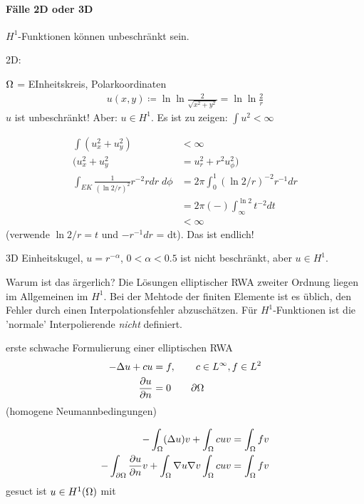 \paragraph{Fälle 2D oder 3D} $H^1$-Funktionen können unbeschränkt sein.
\begin{beispiel} 2D:

$\Omega$ = EInheitskreis, Polarkoordinaten
\begin{align*}
  u(x, y) \coloneqq \ln \ln \frac{2}{\sqrt{x^2 + y^2}} = \ln \ln \frac{2}{r}
\end{align*}
$u$ ist unbeschränkt! Aber: $u \in H^1$. Es ist zu zeigen: $\int u^2< \infty$

\begin{align*}
  \int (u_x^2 + u_y^2)&<\infty \\
( u_x^2 + u_y^2 &= u_r^2 + r^2u_\phi^2 ) \\
\int_{EK} \frac{1}{(\ln 2/r)^2} r^{-2} r dr \; d \phi &= 2 \pi \int_0^1 (\ln 2/r)^{-2} r^{-1} dr\\
&= 2 \pi (-) \int_\infty^{\ln 2} t^{-2} dt \\
&< \infty
\end{align*}
(verwende $\ln 2/r = t$ und $-r^{-1} dr$ = dt). Das ist endlich!
\end{beispiel}
\begin{beispiel} 3D
Einheitskugel, $u = r^{-\alpha}$, $0< \alpha<0.5$ ist nicht beschränkt, aber $u \in H^1$.
\end{beispiel}
Warum ist das ärgerlich? Die Lösungen elliptischer RWA zweiter Ordnung liegen im Allgemeinen im $H^1$. Bei der Mehtode der finiten Elemente ist es üblich, den Fehler durch einen Interpolationsfehler abzuschätzen. Für $H^1$-Funktionen ist die 'normale' Interpolierende \emph{nicht} definiert.
\begin{beispiel}
  erste schwache Formulierung einer elliptischen RWA
  \begin{align*}
    - \Delta u + c u &= f, \qquad c \in L^\infty, f \in L^2\\
\frac{\partial u}{\partial n} &= 0 \qquad \partial \Omega
  \end{align*}
(homogene Neumannbedingungen)
\end{beispiel}
\begin{align*}
  -\int_\Omega (\Delta u ) v + \int_\Omega c u v = \int_\Omega fv\\
  -\int_{\partial\Omega} \frac{\partial u}{\partial n} v + \int_{\Omega} \nabla u \nabla v \int_\Omega c u v = \int_\Omega fv 
\end{align*}
gesuct ist $u \in H^1(\Omega)$ mit 
